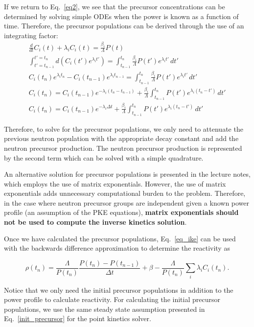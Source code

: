 \documentclass[12pt]{report}
\begin{document}
	If we return to Eq.~\ref{eq2}, we see that the precursor concentrations can be determined by solving simple ODEs when the power is known as a function of time. Therefore, the precursor populations can be derived through the use of an integrating factor:
	\begin{eqnarray}
	\frac{d}{dt} C_i(t) + \lambda_i C_i(t) = \frac{\beta_i}{\Lambda} P(t) \\
	\int_{t'=t_{n-1}}^{t'=t_n} d\left( C_i(t') e^{\lambda_i t'} \right) = \int_{t_{n-1}}^{t_n} \frac{\beta_i}{\Lambda} P(t') e^{\lambda_i t'} \, dt' \\
	C_i(t_n) e^{\lambda_i t_n} - C_i(t_{n-1}) e^{\lambda_i t_{n-1}} = \int_{t_{n-1}}^{t_n} \frac{\beta_i}{\Lambda} P(t') e^{\lambda_i t'} \, dt' \\
	C_i(t_n) =  C_i(t_{n-1})e^{-\lambda_i (t_n -t_{n-1})} + \frac{\beta_i}{\Lambda} \int_{t_{n-1}}^{t_n}  P(t') e^{\lambda_i (t_n - t')} \, dt'  \\
	C_i(t_n) =  C_i(t_{n-1})e^{-\lambda_i \Delta t} + \frac{\beta_i}{\Lambda} \int_{t_{n-1}}^{t_n}  P(t') e^{\lambda_i (t_n - t')} \, dt' 
	\end{eqnarray}
	
	Therefore, to solve for the precursor populations, we only need to attenuate the previous neutron population with the appropriate decay constant and add the neutron precursor production. The neutron precursor production is represented by the second term which can be solved with a simple quadrature.
	
	An alternative solution for precursor populations is presented in the lecture notes, which employs the use of matrix exponentials. However, the use of matrix exponentials adds unnecessary computational burden to the problem. Therefore, in the case where neutron precursor groups are independent given a known power profile (an assumption of the PKE equations), \textbf{matrix exponentials should not be used to compute the inverse kinetics solution}.
	
	Once we have calculated the precursor populations, Eq.~\ref{eq_ike} can be used with the backwards difference approximation to determine the reactivity as
	
	\begin{equation}
	\rho(t_n) = \frac{\Lambda}{P(t_n)}  \frac{P(t_n) - P(t_{n-1})}{\Delta t} + \beta - \frac{\Lambda}{P(t_n)} \sum_i \lambda_i C_i(t_n).
	\end{equation}
	
	Notice that we only need the initial precursor populations in addition to the power profile to calculate reactivity. For calculating the initial precursor populations, we use the same steady state assumption presented in Eq.~\ref{init_precursor} for the point kinetics solver.
	
\end{document}
